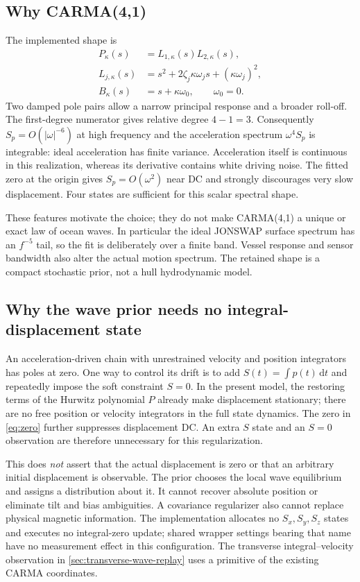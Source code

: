 \documentclass[conference]{IEEEtran}
\newcommand{\dd}{\mathrm d}
\begin{document}
\subsection{Why CARMA(4,1)}
The implemented shape is
\begin{align}
 P_\kappa(s)&=L_{1,\kappa}(s)L_{2,\kappa}(s),\nonumber\\
 L_{j,\kappa}(s)&=s^2+2\zeta_j\kappa\omega_j s+(\kappa\omega_j)^2,
 \label{eq:poles}\\
 B_\kappa(s)&=s+\kappa\omega_0,\qquad \omega_0=0.
 \label{eq:zero}
\end{align}
Two damped pole pairs allow a narrow principal response and a broader
roll-off. The first-degree numerator gives relative degree $4-1=3$.
Consequently $S_p=O(|\omega|^{-6})$ at high frequency and the acceleration
spectrum $\omega^4 S_p$ is integrable: ideal acceleration has finite
variance. Acceleration itself is continuous in this realization, whereas
its derivative contains white driving noise. The fitted zero at the
origin gives $S_p=O(\omega^2)$ near DC and strongly discourages very slow
displacement. Four states are sufficient for this scalar spectral shape.

These features motivate the choice; they do not make CARMA(4,1) a unique
or exact law of ocean waves. In particular the ideal JONSWAP surface
spectrum has an $f^{-5}$ tail, so the fit is deliberately over a finite
band. Vessel response and sensor bandwidth also alter the actual motion
spectrum. The retained shape is a compact stochastic prior, not a hull
hydrodynamic model.

\subsection{Why the wave prior needs no integral-displacement state}
An acceleration-driven chain with unrestrained velocity and position
integrators has poles at zero. One way to control its drift is to add
$S(t)=\int p(t)\,\dd t$ and repeatedly impose the soft constraint $S=0$.
In the present model, the restoring terms of the Hurwitz polynomial $P$
already make displacement stationary; there are no free position or
velocity integrators in the full state dynamics. The zero in
\cref{eq:zero} further suppresses displacement DC. An extra $S$ state and
an $S=0$ observation are therefore unnecessary for this regularization.

This does \emph{not} assert that the actual displacement is zero or that
an arbitrary initial displacement is observable. The prior chooses the
local wave equilibrium and assigns a distribution about it. It cannot
recover absolute position or eliminate tilt and bias ambiguities. A
covariance regularizer also cannot replace physical magnetic information.
The implementation allocates no $S_x,S_y,S_z$ states and executes no
integral-zero update; shared wrapper settings bearing that name have no
measurement effect in this configuration. The transverse integral--velocity
observation in \cref{sec:transverse-wave-replay} uses a primitive of the
existing CARMA coordinates.
\end{document}
